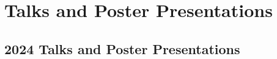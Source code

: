 \documentclass[11pt,a4paper,sans]{moderncv}        %
\begin{document}
\section{Talks and Poster Presentations}



\subsection{2024 Talks and Poster Presentations}
\vspace{4pt}
\end{document}

